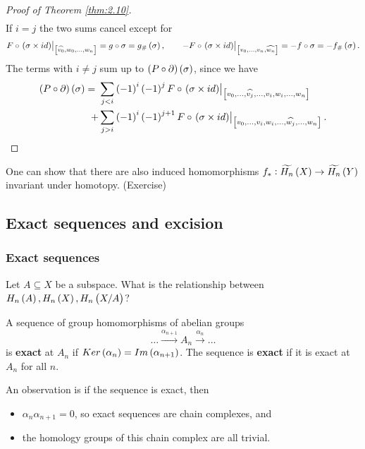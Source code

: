 \begin{proof}[Proof of Theorem \ref{thm:2.10}]
\begin{align*}
\end{align*}
If $ i = j $ the two sums cancel except for
$$ F \circ \eval{\br{\sigma \times id}}_{\sbr{\widehat{v_0}, w_0, \dots, w_n}} = g \circ \sigma = g_\#\br{\sigma}, \qquad -F \circ \eval{\br{\sigma \times id}}_{\sbr{v_0, \dots, v_n, \widehat{w_n}}} = -f \circ \sigma = -f_\#\br{\sigma}. $$
The terms with $ i \ne j $ sum up to $ \br{P \circ \partial}\br{\sigma} $, since we have
\begin{align*}
\br{P \circ \partial}\br{\sigma}
= \ & \sum_{j < i} \br{-1}^i\br{-1}^jF \circ \eval{\br{\sigma \times id}}_{\sbr{v_0, \dots, \widehat{v_j}, \dots, v_i, w_i, \dots, w_n}} \\
+ & \sum_{j > i} \br{-1}^i\br{-1}^{j + 1}F \circ \eval{\br{\sigma \times id}}_{\sbr{v_0, \dots, v_i, w_i, \dots, \widehat{w_j}, \dots, w_n}}.
\end{align*}
\end{proof}


\begin{remark*}
One can show that there are also induced homomorphisms $ f_* : \widetilde{H_n}\br{X} \to \widetilde{H_n}\br{Y} $ invariant under homotopy. (Exercise)
\end{remark*}

\pagebreak

\subsection{Exact sequences and excision}

\subsubsection{Exact sequences}

Let $ A \subseteq X $ be a subspace. What is the relationship between $ H_n\br{A}, H_n\br{X}, H_n\br{X / A} $?

\begin{definition*}
A sequence of group homomorphisms of abelian groups
$$ \dots \xrightarrow{\alpha_{n + 1}} A_n \xrightarrow{\alpha_n} \dots $$
is \textbf{exact} at $ A_n $ if $ Ker\br{\alpha_n} = Im\br{\alpha_{n + 1}} $. The sequence is \textbf{exact} if it is exact at $ A_n $ for all $ n $.
\end{definition*}

An observation is if the sequence is exact, then
\begin{itemize}
\item $ \alpha_n\alpha_{n + 1} = 0 $, so exact sequences are chain complexes, and
\item the homology groups of this chain complex are all trivial.
\end{itemize}

